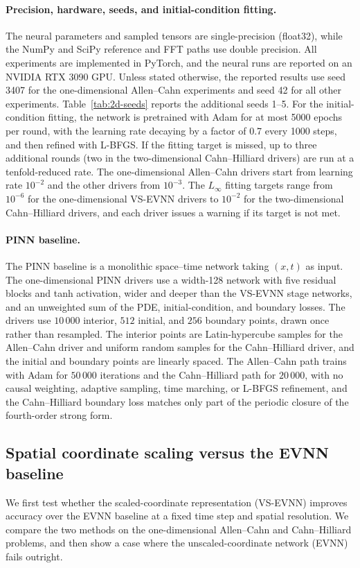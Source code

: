 \documentclass[11pt,letterpaper]{article}
\theoremstyle{plain}
\theoremstyle{definition}
\begin{document}
\paragraph{Precision, hardware, seeds, and initial-condition fitting.} The neural parameters and sampled tensors are single-precision (float32), while the NumPy and SciPy reference and FFT paths use double precision. All experiments are implemented in PyTorch, and the neural runs are reported on an NVIDIA RTX 3090 GPU. Unless stated otherwise, the reported results use seed 3407 for the one-dimensional Allen--Cahn experiments and seed 42 for all other experiments. Table~\ref{tab:2d-seeds} reports the additional seeds 1--5. For the initial-condition fitting, the network is pretrained with Adam for at most 5000 epochs per round, with the learning rate decaying by a factor of 0.7 every 1000 steps, and then refined with L-BFGS. If the fitting target is missed, up to three additional rounds (two in the two-dimensional Cahn--Hilliard drivers) are run at a tenfold-reduced rate. The one-dimensional Allen--Cahn drivers start from learning rate $10^{-2}$ and the other drivers from $10^{-3}$. The $L_\infty$ fitting targets range from $10^{-6}$ for the one-dimensional VS-EVNN drivers to $10^{-2}$ for the two-dimensional Cahn--Hilliard drivers, and each driver issues a warning if its target is not met.

\paragraph{PINN baseline.} The PINN baseline is a monolithic space--time network taking $(x,t)$ as input. The one-dimensional PINN drivers use a width-128 network with five residual blocks and tanh activation, wider and deeper than the VS-EVNN stage networks, and an unweighted sum of the PDE, initial-condition, and boundary losses. The drivers use $10\,000$ interior, $512$ initial, and $256$ boundary points, drawn once rather than resampled. The interior points are Latin-hypercube samples for the Allen--Cahn driver and uniform random samples for the Cahn--Hilliard driver, and the initial and boundary points are linearly spaced. The Allen--Cahn path trains with Adam for $50\,000$ iterations and the Cahn--Hilliard path for $20\,000$, with no causal weighting, adaptive sampling, time marching, or L-BFGS refinement, and the Cahn--Hilliard boundary loss matches only part of the periodic closure of the fourth-order strong form.

\subsection{Spatial coordinate scaling versus the EVNN baseline} We first test whether the scaled-coordinate representation (VS-EVNN) improves accuracy over the EVNN baseline at a fixed time step and spatial resolution. We compare the two methods on the one-dimensional Allen--Cahn and Cahn--Hilliard problems, and then show a case where the unscaled-coordinate network (EVNN) fails outright.
\end{document}
